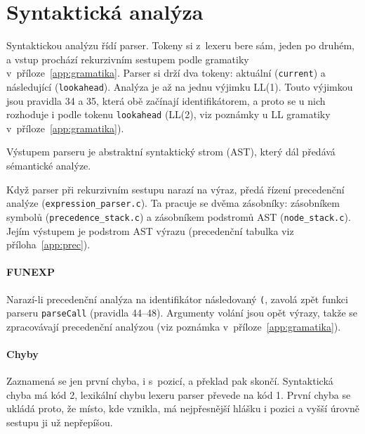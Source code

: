 \section{Syntaktická analýza}
\label{sec:parser}
\sloppy %

Syntaktickou analýzu řídí parser. Tokeny si z~lexeru bere sám, jeden po druhém, a vstup prochází rekurzivním sestupem podle gramatiky v~příloze~\ref{app:gramatika}. Parser si drží dva tokeny: aktuální (\texttt{current}) a následující (\texttt{lookahead}). Analýza je až na jednu výjimku LL(1). Touto výjimkou jsou pravidla 34 a 35, která obě začínají identifikátorem, a proto se u nich rozhoduje i podle tokenu \texttt{lookahead} (LL(2), viz poznámky u LL gramatiky v~příloze~\ref{app:gramatika}).

Výstupem parseru je abstraktní syntaktický strom (AST), který dál předává sémantické analýze.

Když parser při rekurzivním sestupu narazí na výraz, předá řízení precedenční analýze (\texttt{expression\_parser.c}). Ta pracuje se dvěma zásobníky: zásobníkem symbolů (\texttt{precedence\_stack.c}) a zásobníkem podstromů AST (\texttt{node\_stack.c}). Jejím výstupem je podstrom AST výrazu (precedenční tabulka viz příloha~\ref{app:prec}).

\paragraph{FUNEXP} Narazí-li precedenční analýza na identifikátor následovaný \texttt{(}, zavolá zpět funkci parseru \texttt{parseCall} (pravidla 44--48). Argumenty volání jsou opět výrazy, takže se zpracovávají precedenční analýzou (viz poznámka v~příloze~\ref{app:gramatika}).

\paragraph{Chyby} Zaznamená se jen první chyba, i s~pozicí, a překlad pak skončí. Syntaktická chyba má kód 2, lexikální chybu lexeru parser převede na kód 1. První chyba se ukládá proto, že místo, kde vznikla, má nejpřesnější hlášku i pozici a vyšší úrovně sestupu ji už nepřepíšou.


